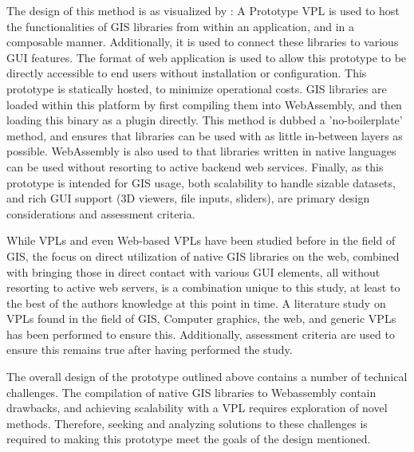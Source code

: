 The design of this method is as visualized by : 
A Prototype VPL is used to host the functionalities of \ac{GIS} libraries from within an application, and in a composable manner. Additionally, it is used to connect these libraries to various \ac{GUI} features. 
The format of web application is used to allow this prototype to be directly accessible to end users without installation or configuration. 
This prototype is statically hosted, to minimize operational costs.
\ac{GIS} libraries are loaded within this platform by first compiling them into WebAssembly, and then loading this binary as a plugin directly. 
This method is dubbed a 'no-boilerplate' method, and ensures that libraries can be used with as little in-between layers as possible.
WebAssembly is also used to that libraries written in native languages can be used without resorting to active backend web services. 
Finally, as this prototype is intended for \ac{GIS} usage, both scalability to handle sizable datasets, and rich \ac{GUI} support (3D viewers, file inputs, sliders), are primary design considerations and assessment criteria. 

While VPLs and even Web-based VPLs have been studied before in the field of \ac{GIS}, the focus on direct utilization of native \ac{GIS} libraries on the web, combined with bringing those in direct contact with various \ac{GUI} elements, all without resorting to active web servers, is a combination unique to this study, at least to the best of the authors knowledge at this point in time. 
A literature study on \ac{VPL}s found in the field of \ac{GIS}, Computer graphics, the web, and generic VPLs has been performed to ensure this.
Additionally, assessment criteria are used to ensure this remains true after having performed the study.

The overall design of the prototype outlined above contains a number of technical challenges.
The compilation of native \ac{GIS} libraries to Webassembly contain drawbacks, and achieving scalability with a VPL requires exploration of novel methods. 
Therefore, seeking and analyzing solutions to these challenges is required to making this prototype meet the goals of the design mentioned. 

